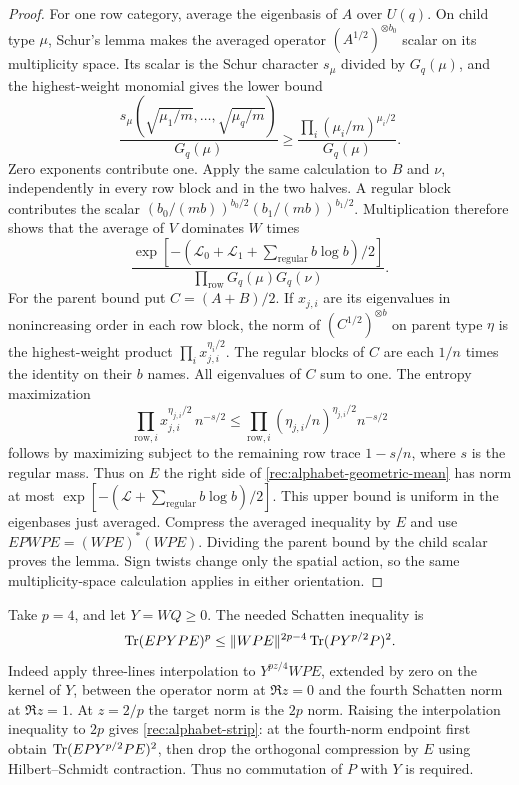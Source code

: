 \begin{proof}
For one row category, average the eigenbasis of $A$ over $U(q)$.
On child type $\mu$, Schur's lemma makes the averaged operator
$(A^{1/2})^{\otimes b_0}$ scalar on its multiplicity space.  Its scalar is
the Schur character $s_\mu$ divided by $G_q(\mu)$, and the highest-weight
monomial gives the lower bound
\[
 \frac{s_\mu(\sqrt{\mu_1/m},\ldots,\sqrt{\mu_q/m})}{G_q(\mu)}
 \ge \frac{\prod_i(\mu_i/m)^{\mu_i/2}}{G_q(\mu)}.
\]
Zero exponents contribute one.  Apply the same calculation to $B$
and $\nu$, independently in every row block and in the two halves.
A regular block contributes the scalar
$(b_0/(mb))^{b_0/2}(b_1/(mb))^{b_1/2}$.  Multiplication therefore
shows that the average of $V$ dominates $W$ times
\[
 \frac{\exp[-(\mathcal L_0+\mathcal L_1+
                      \sum_{\mathrm{regular}}b\log b)/2]}
      {\prod_{\mathrm{row}}G_q(\mu)G_q(\nu)}.
\]
For the parent bound put $C=(A+B)/2$.  If $x_{j,i}$ are its
eigenvalues in nonincreasing order in each row block, the norm of
$(C^{1/2})^{\otimes b}$ on
parent type $\eta$ is the highest-weight product
$\prod_i x_{j,i}^{\eta_i/2}$.  The regular blocks of $C$ are each
$1/n$ times the identity on their $b$ names.  All eigenvalues of
$C$ sum to one.  The entropy maximization
\[
 \prod_{\mathrm{row},i}x_{j,i}^{\eta_{j,i}/2}\,n^{-s/2}
 \le \prod_{\mathrm{row},i}(\eta_{j,i}/n)^{\eta_{j,i}/2}
                  n^{-s/2}
\]
follows by maximizing subject to the remaining row trace $1-s/n$,
where $s$ is the regular mass.  Thus on $E$ the right side of
\eqref{rec:alphabet-geometric-mean} has norm at most
$\exp[-(\mathcal L+\sum_{\mathrm{regular}}b\log b)/2]$.
This upper bound is uniform in the eigenbases just averaged.  Compress
the averaged inequality by $E$ and use
$EPWPE=(WPE)^*(WPE)$.  Dividing the parent bound by the child scalar
proves the lemma.  Sign twists change only the spatial action, so the
same multiplicity-space calculation applies in either orientation.
\end{proof}

Take $p=4$, and let $Y=WQ\ge0$.  The needed Schatten inequality is
\begin{equation}\label{rec:alphabet-strip}
 \operatorname{Tr}(EPYPE)^p
 \le\|WPE\|^{2p-4}\operatorname{Tr}(PY^{p/2}P)^2.
\end{equation}
Indeed apply three-lines interpolation to $Y^{pz/4}WPE$, extended
by zero on the kernel of $Y$, between the operator norm at $\Re z=0$
and the fourth Schatten norm at $\Re z=1$.  At $z=2/p$ the target
norm is the $2p$ norm.  Raising the interpolation inequality to $2p$
gives \eqref{rec:alphabet-strip}: at the fourth-norm endpoint first
obtain $\operatorname{Tr}(EPY^{p/2}PE)^2$, then drop the orthogonal compression
by $E$ using Hilbert--Schmidt contraction.  Thus no commutation of $P$
with $Y$ is required.

